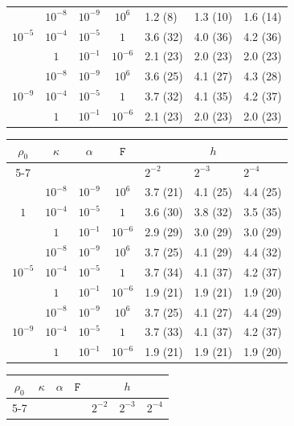 \documentclass[11pt, reqno, a4paper, twoside]{article}
\newcommand{\rF}{\mathtt{F}}
\numberwithin{equation}{section}
\numberwithin{remark}{section}
\numberwithin{figure}{section}
\numberwithin{table}{section}
\begin{document}
\begin{table}[t]
{\begin{minipage}{0.48\textwidth}
\begin{tabular}{|c |c|c| c|lll|}
\multirow{3}{*}{$10^{-5}$}
& $10^{-8}$ & $10^{-9}$ & $10^{6}$ & 1.2 (8) &1.3 (10) &1.6 (14) \\
& $10^{-4}$ & $10^{-5}$ & $1$ &3.6 (32) &4.0 (36) &4.2 (36) \\
& $1$ & $10^{-1}$ & $10^{-6}$ &2.1 (23) &2.0 (23) &2.0 (23) \\
\hline

\multirow{3}{*}{$10^{-9}$}
& $10^{-8}$ & $10^{-9}$ & $10^{6}$ & 3.6 (25)&4.1 (27) &4.3 (28) \\
& $10^{-4}$ & $10^{-5}$ & $1$ &3.7 (32) &4.1 (35) &4.2 (37) \\
& $1$ & $10^{-1}$ & $10^{-6}$ &2.1 (23) &2.0 (23) &2.0 (23) \\
\hline
\end{tabular}
\end{minipage}}

\vspace{0.4cm}

{\begin{minipage}{0.48\textwidth}
\centering
\begin{tabular}{|c |c|c| c|lll|}
\hline
$\rho_0$ & $\kappa$ & $\alpha$ & $\rF$ & \multicolumn{3}{c|}{$h$} \\
\cline{5-7}
 & & & & $2^{-2}$ & $2^{-3}$ & $2^{-4}$ \\
\hline

\multirow{3}{*}{$1$}
& $10^{-8}$ & $10^{-9}$ & $10^{6}$ & 3.7 (21) & 4.1 (25)& 4.4 (25) \\
& $10^{-4}$ & $10^{-5}$ & $1$ & 3.6 (30)& 3.8 (32) & 3.5 (35)\\
& $1$ & $10^{-1}$ & $10^{-6}$ &2.9 (29) &3.0 (29) &3.0 (29) \\
\hline

\multirow{3}{*}{$10^{-5}$}
& $10^{-8}$ & $10^{-9}$ & $10^{6}$ & 3.7 (25) & 4.1 (29) & 4.4 (32) \\
& $10^{-4}$ & $10^{-5}$ & $1$ &3.7 (34) &4.1 (37) &4.2 (37) \\
& $1$ & $10^{-1}$ & $10^{-6}$ &1.9 (21) &1.9 (21) &1.9 (20) \\
\hline

\multirow{3}{*}{$10^{-9}$}
& $10^{-8}$ & $10^{-9}$ & $10^{6}$ & 3.7 (25)&4.1 (27) &4.4 (29) \\
& $10^{-4}$ & $10^{-5}$ & $1$ &3.7 (33) &4.1 (37) &4.2 (37) \\
& $1$ & $10^{-1}$ & $10^{-6}$ &1.9 (21) &1.9 (21) &1.9 (20) \\
\hline
\end{tabular}
\end{minipage}}
\hfill
{\begin{minipage}{0.48\textwidth}
\centering
\begin{tabular}{|c |c|c| c|lll|}
\hline
$\rho_0$ & $\kappa$ & $\alpha$ & $\rF$ & \multicolumn{3}{c|}{$h$} \\
\cline{5-7}
 & & & & $2^{-2}$ & $2^{-3}$ & $2^{-4}$ \\
\hline


\end{tabular}
\end{minipage}}
\end{table}
\end{document}
